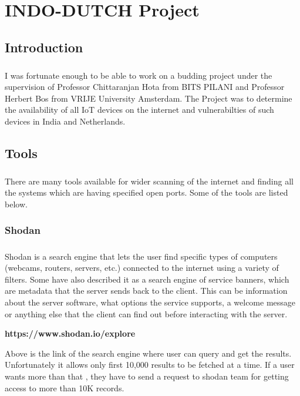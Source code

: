 \documentclass{report}
\begin{document}
\chapter{INDO-DUTCH Project}


\section{Introduction}
\paragraph{}
I was fortunate enough to be able to work on a budding project under the supervision of Professor Chittaranjan Hota from BITS PILANI and Professor Herbert Bos from VRIJE University Amsterdam. The Project was to determine the availability of all IoT devices on the internet and vulnerabilties of such devices in India and Netherlands. 

\section{Tools}
\paragraph{}
There are many tools available for wider scanning of the internet and finding all the systems which are having specified open ports. Some of the tools are listed below.

\subsection{Shodan}
\paragraph{}
Shodan is a search engine that lets the user find specific types of computers (webcams, routers, servers, etc.) connected to the internet using a variety of filters. Some have also described it as a search engine of service banners, which are metadata that the server sends back to the client. This can be information about the server software, what options the service supports, a welcome message or anything else that the client can find out before interacting with the server.
\begin{center}
\textbf{https://www.shodan.io/explore} 
\end{center}
Above is the link of the search engine where user can query and get the results. Unfortunately it allows only first 10,000 results to be fetched at a time. If a user wants more than that , they have to send a request to shodan team for getting access to more than 10K records.
\end{document}

